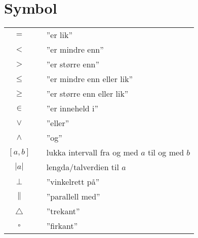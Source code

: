 



\section*{Symbol} \label{Symbol}
\renewcommand{\arraystretch}{1.2}
\begin{tabular}{@{}cp{0.4cm}l}
$ = $ && ''er lik'' \\
$ < $ && ''er mindre enn'' \\
$ > $ && ''er større enn'' \\
$ \leq $ && ''er mindre enn eller lik'' \\
$ \geq $ && ''er større enn eller lik'' \\		
$ \in $ && ''er inneheld i'' \\
$ \vee $&&''eller''\\
$ \wedge $&&''og''\\
$ [a, b] $ && lukka intervall fra og med $ a $ til og med $ b $\\
$|a| $ &&  lengda/talverdien til $ a $\\
$\perp $ &&  ''vinkelrett på'' \\
$\parallel $ &&  ''parallell med'' \\
$\triangle $ &&  ''trekant'' \\
$\square $ &&  ''firkant'' \\

\end{tabular}
\renewcommand{\arraystretch}{1}

